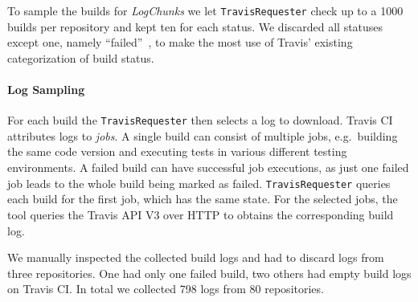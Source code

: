 \documentclass[\myrootdir/main.tex]{subfiles}
\begin{document}
To sample the builds for \emph{LogChunks} we let \texttt{TravisRequester} check up to a 1000 builds per repository and kept ten for each status.
We discarded all statuses except one, namely ``failed''~\cite{travis2009buildstatus}, to make the most use of Travis' existing categorization of build status.

\paragraph{Log Sampling}
For each build the \texttt{TravisRequester} then selects a log to download.
Travis CI attributes logs to \emph{jobs}.
A single build can consist of multiple jobs, e.g.\ building the same code version and executing tests in various different testing environments.
A failed build can have successful job executions, as just one failed job leads to the whole build being marked as failed.
\texttt{TravisRequester} queries each build for the first job, which has the same state.
For the selected jobs, the tool queries the Travis API V3 over HTTP to obtains the corresponding build log.

We manually inspected the collected build logs and had to discard logs from three repositories.
One had only one failed build, two others had empty build logs on Travis CI.
In total we collected 798  logs from 80 repositories.



\end{document}
